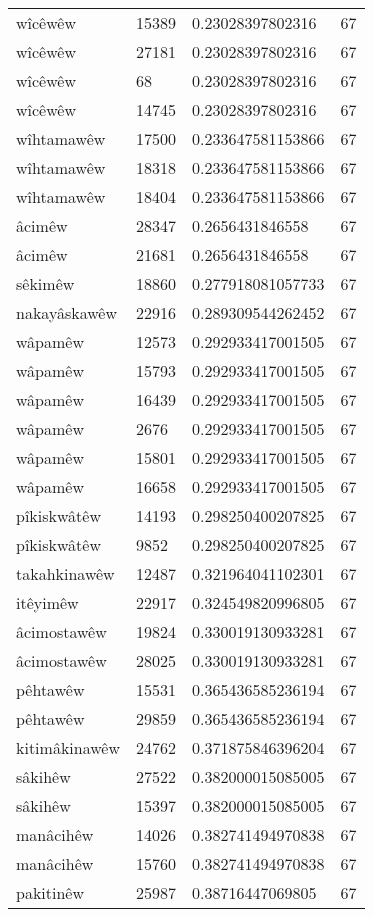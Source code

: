\begin{longtable}{llll}
wîcêwêw & 15389 & 0.23028397802316 & 67\\
wîcêwêw & 27181 & 0.23028397802316 & 67\\
wîcêwêw & 68 & 0.23028397802316 & 67\\
wîcêwêw & 14745 & 0.23028397802316 & 67\\
wîhtamawêw & 17500 & 0.233647581153866 & 67\\
wîhtamawêw & 18318 & 0.233647581153866 & 67\\
wîhtamawêw & 18404 & 0.233647581153866 & 67\\
âcimêw & 28347 & 0.2656431846558 & 67\\
âcimêw & 21681 & 0.2656431846558 & 67\\
sêkimêw & 18860 & 0.277918081057733 & 67\\
nakayâskawêw & 22916 & 0.289309544262452 & 67\\
wâpamêw & 12573 & 0.292933417001505 & 67\\
wâpamêw & 15793 & 0.292933417001505 & 67\\
wâpamêw & 16439 & 0.292933417001505 & 67\\
wâpamêw & 2676 & 0.292933417001505 & 67\\
wâpamêw & 15801 & 0.292933417001505 & 67\\
wâpamêw & 16658 & 0.292933417001505 & 67\\
pîkiskwâtêw & 14193 & 0.298250400207825 & 67\\
pîkiskwâtêw & 9852 & 0.298250400207825 & 67\\
takahkinawêw & 12487 & 0.321964041102301 & 67\\
itêyimêw & 22917 & 0.324549820996805 & 67\\
âcimostawêw & 19824 & 0.330019130933281 & 67\\
âcimostawêw & 28025 & 0.330019130933281 & 67\\
pêhtawêw & 15531 & 0.365436585236194 & 67\\
pêhtawêw & 29859 & 0.365436585236194 & 67\\
kitimâkinawêw & 24762 & 0.371875846396204 & 67\\
sâkihêw & 27522 & 0.382000015085005 & 67\\
sâkihêw & 15397 & 0.382000015085005 & 67\\
manâcihêw & 14026 & 0.382741494970838 & 67\\
manâcihêw & 15760 & 0.382741494970838 & 67\\
pakitinêw & 25987 & 0.38716447069805 & 67\\

\end{longtable}
